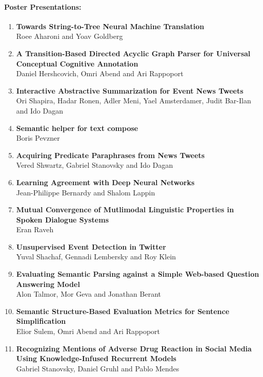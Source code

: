 \documentclass[a0,portrait]{a0poster}
\begin{document}
\paragraph{Poster Presentations:}\label{poster-presentations}

\begin{enumerate}
\item
  \textbf{Towards String-to-Tree Neural Machine Translation}\\
  Roee Aharoni and Yoav Goldberg
\item
  \textbf{A Transition-Based Directed Acyclic Graph Parser for Universal
  Conceptual Cognitive Annotation}\\
  Daniel Hershcovich, Omri Abend and Ari Rappoport
\item
  \textbf{Interactive Abstractive Summarization for Event News Tweets}\\
  Ori Shapira, Hadar Ronen, Adler Meni, Yael Amsterdamer, Judit Bar-Ilan
  and Ido Dagan
\item
  \textbf{Semantic helper for text compose}\\
  Boris Pevzner
\item
  \textbf{Acquiring Predicate Paraphrases from News Tweets}\\
  Vered Shwartz, Gabriel Stanovsky and Ido Dagan
\item
  \textbf{Learning Agreement with Deep Neural Networks}\\
  Jean-Philippe Bernardy and Shalom Lappin
\item
  \textbf{Mutual Convergence of Mutlimodal Linguistic Properties in
  Spoken Dialogue Systems}\\
  Eran Raveh
\item
  \textbf{Unsupervised Event Detection in Twitter}\\
  Yuval Shachaf, Gennadi Lembersky and Roy Klein
\item
  \textbf{Evaluating Semantic Parsing against a Simple Web-based
  Question Answering Model}\\
  Alon Talmor, Mor Geva and Jonathan Berant
\item
  \textbf{Semantic Structure-Based Evaluation Metrics for Sentence
  Simplification}\\
  Elior Sulem, Omri Abend and Ari Rappoport
\item
  \textbf{Recognizing Mentions of Adverse Drug Reaction in Social Media
  Using Knowledge-Infused Recurrent Models}\\
  Gabriel Stanovsky, Daniel Gruhl and Pablo Mendes

\end{enumerate}
\end{document}

